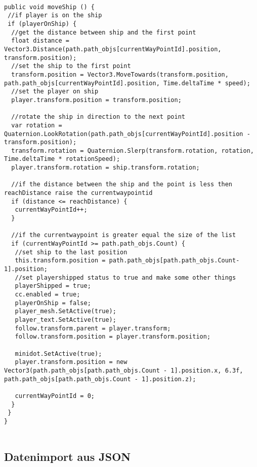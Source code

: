 \begin{scriptsize}
\lstset{
	float,
	caption=Methode moveShip, 
	language=[Sharp]C, 
	frame=single,  
	showstringspaces=false, 
	showspaces=false, 
	numbers=left, 
	captionpos=b, 
	belowcaptionskip=4pt,
	basicstyle=\ttfamily
} 
\begin{lstlisting}[label=lst:methode2]

public void moveShip () {
 //if player is on the ship
 if (playerOnShip) {
  //get the distance between ship and the first point
  float distance = Vector3.Distance(path.path_objs[currentWayPointId].position, transform.position);
  //set the ship to the first point
  transform.position = Vector3.MoveTowards(transform.position, path.path_objs[currentWayPointId].position, Time.deltaTime * speed);
  //set the player on ship
  player.transform.position = transform.position;

  //rotate the ship in direction to the next point
  var rotation = Quaternion.LookRotation(path.path_objs[currentWayPointId].position - transform.position);
  transform.rotation = Quaternion.Slerp(transform.rotation, rotation, Time.deltaTime * rotationSpeed);
  player.transform.rotation = ship.transform.rotation;

  //if the distance between the ship and the point is less then reachDistance raise the currentwaypointid
  if (distance <= reachDistance) {
   currentWayPointId++;
  }

  //if the currentwaypoint is greater equal the size of the list
  if (currentWayPointId >= path.path_objs.Count) {
   //set ship to the last position
   this.transform.position = path.path_objs[path.path_objs.Count-1].position;
   //set playershipped status to true and make some other things
   playerShipped = true;
   cc.enabled = true;
   playerOnShip = false;
   player_mesh.SetActive(true);
   player_text.SetActive(true);
   follow.transform.parent = player.transform;
   follow.transform.position = player.transform.position;

   minidot.SetActive(true);
   player.transform.position = new Vector3(path.path_objs[path.path_objs.Count - 1].position.x, 6.3f, path.path_objs[path.path_objs.Count - 1].position.z);
                
   currentWayPointId = 0;
  }
 }
}
    
\end{lstlisting}
\end{scriptsize}

\subsection{Datenimport aus JSON}

